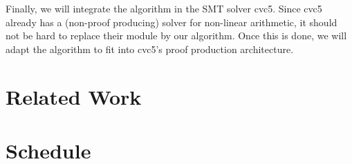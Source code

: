 \documentclass[a4paper, 12pt]{article}
\newcommand{\yell}[1]{{\color{blue} [#1]}}
\newcommand{\tom}[1]{\yell{#1 --tom}}
\begin{document}
Finally, we will integrate the algorithm in the SMT solver cvc5. Since cvc5 already has a (non-proof producing) solver for non-linear arithmetic,
it should not be hard to replace their module by our algorithm. Once this is done, we will adapt the algorithm to fit into cvc5's proof production
architecture.





\section{Related Work}






\section{Schedule}

\end{document}
